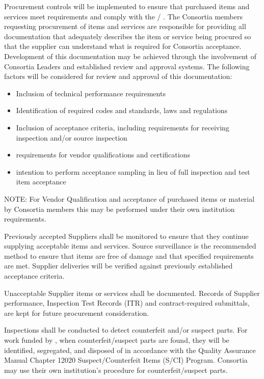 Procurement controls will be implemented to ensure that purchased
items and services meet  requirements and comply with the
/ .  The Consortia members requesting
procurement of items and services are responsible for providing all
documentation that adequately describes the item or service being
procured so that the supplier can understand what is required for
Consortia acceptance. Development of this documentation may be
achieved through the involvement of Consortia Leaders and established
review and approval systems. The following factors will be considered
for review and approval of this documentation:
\begin{itemize}
 \item Inclusion of technical performance requirements
 \item Identification of required codes and standards, laws and regulations
 \item Inclusion of acceptance criteria, including requirements for receiving inspection and/or source inspection
 \item {} requirements for vendor qualifications and certifications
 \item {} intention to perform acceptance sampling in lieu of full inspection and test item acceptance
\end{itemize}
NOTE: For Vendor Qualification and acceptance of purchased items or
material by Consortia members this may be performed under their own
institution requirements.

Previously accepted Suppliers shall be monitored to ensure that they
continue supplying acceptable items and services. Source surveillance
is the recommended method to ensure that items are free of damage and
that specified requirements are met. Supplier deliveries will be
verified against previously established acceptance criteria.

Unacceptable Supplier items or services shall be documented. Records
of Supplier performance, Inspection Test Records (ITR) and
contract-required submittals, are kept for future procurement
consideration.

Inspections shall be conducted to detect counterfeit and/or suspect
parts. For work funded by , when counterfeit/suspect parts are
found, they will be identified, segregated, and disposed of in
accordance with the \fnal Quality Assurance Manual Chapter 12020
Suspect/Counterfeit Items (S/CI) Program.  Consortia may use their
own institution’s procedure for counterfeit/suspect parts.

